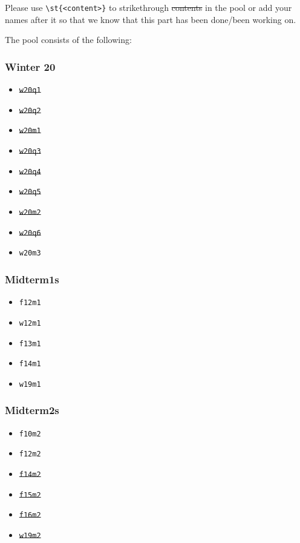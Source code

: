 Please use \lstinline|\st{<content>}| to strikethrough \st{contents} in the pool or add your names after it so that we know that this part has been done/been working on.

The pool consists of the following:

\def\width{0.24}
\begin{minipage}[t]{\width\textwidth}
    \subsubsection*{Winter 20}
    \begin{itemize}
        \item \st{\texttt{w20q1}}
        \item \st{\texttt{w20q2}}
        \item \st{\texttt{w20m1}}
        \item \st{\texttt{w20q3}}
        \item \st{\texttt{w20q4}}
        \item \st{\texttt{w20q5}}
        \item \st{\texttt{w20m2}}
        \item \st{\texttt{w20q6}}
        \item \texttt{w20m3}
    \end{itemize}
\end{minipage}
\begin{minipage}[t]{\width\textwidth}
    \subsubsection*{Midterm1s}
    \begin{itemize}
        \item \texttt{f12m1}
        \item \texttt{w12m1}
        \item \texttt{f13m1}
        \item \texttt{f14m1}
        \item \texttt{w19m1}
    \end{itemize}    
\end{minipage}
\begin{minipage}[t]{\width\textwidth}
    \subsubsection*{Midterm2s}
    \begin{itemize}
        \item \texttt{f10m2}
        \item \texttt{f12m2}
        \item \st{\texttt{f14m2}}
        \item \st{\texttt{f15m2}}
        \item \st{\texttt{f16m2}}
        \item \st{\texttt{w19m2}}
    \end{itemize}    
\end{minipage}
